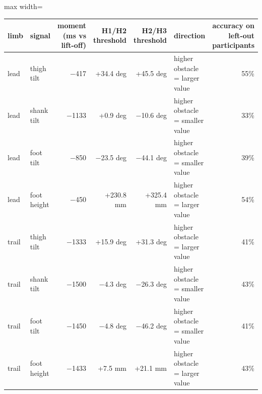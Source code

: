 \begin{adjustbox}{max width=\textwidth}
{\scriptsize
\begin{tabular}{llrrrlr}
\toprule
\textbf{limb} & \textbf{signal} & \textbf{moment (ms vs lift-off)} & \textbf{H1/H2 threshold} & \textbf{H2/H3 threshold} & \textbf{direction} & \textbf{accuracy on left-out participants} \\
\midrule
lead & thigh tilt & $-$417 & +34.4 deg & +45.5 deg & higher obstacle = larger value & 55\% \\
lead & shank tilt & $-$1133 & +0.9 deg & $-$10.6 deg & higher obstacle = smaller value & 33\% \\
lead & foot tilt & $-$850 & $-$23.5 deg & $-$44.1 deg & higher obstacle = smaller value & 39\% \\
lead & foot height & $-$450 & +230.8 mm & +325.4 mm & higher obstacle = larger value & 54\% \\
trail & thigh tilt & $-$1333 & +15.9 deg & +31.3 deg & higher obstacle = larger value & 41\% \\
trail & shank tilt & $-$1500 & $-$4.3 deg & $-$26.3 deg & higher obstacle = smaller value & 43\% \\
trail & foot tilt & $-$1450 & $-$4.8 deg & $-$46.2 deg & higher obstacle = smaller value & 41\% \\
trail & foot height & $-$1433 & +7.5 mm & +21.1 mm & higher obstacle = larger value & 43\% \\
\bottomrule
\end{tabular}
}
\end{adjustbox}
